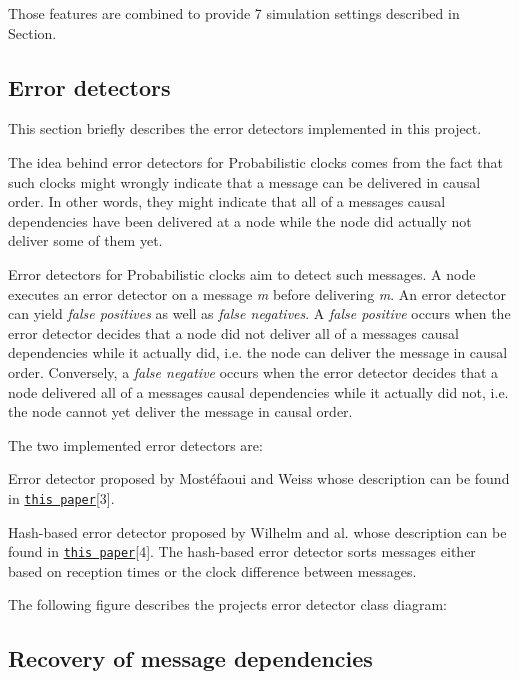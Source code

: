 Those features are combined to provide 7 simulation settings described in Section.

\subsection*{Error detectors}

This section briefly describes the error detectors implemented in this project.

The idea behind error detectors for Probabilistic clocks comes from the fact that such clocks might wrongly indicate that a message can be delivered in causal order. In other words, they might indicate that all of a message\textquotesingle{}s causal dependencies have been delivered at a node while the node did actually not deliver some of them yet.

Error detectors for Probabilistic clocks aim to detect such messages. A node executes an error detector on a message {\itshape m} before delivering {\itshape m}. An error detector can yield {\itshape false positives} as well as {\itshape false negatives}. A {\itshape false positive} occurs when the error detector decides that a node did not deliver all of a message\textquotesingle{}s causal dependencies while it actually did, i.\+e. the node can deliver the message in causal order. Conversely, a {\itshape false negative} occurs when the error detector decides that a node delivered all of a message\textquotesingle{}s causal dependencies while it actually did not, i.\+e. the node cannot yet deliver the message in causal order.

The two implemented error detectors are\+:
\begin{DoxyEnumerate}
\item Error detector proposed by Mostéfaoui and Weiss whose description can be found in \href{https://hal.science/hal-02056349/document}{\tt this paper}\mbox{[}3\mbox{]}.
\item Hash-\/based error detector proposed by Wilhelm and al. whose description can be found in \href{https://hal.science/hal-03984499}{\tt this paper}\mbox{[}4\mbox{]}. The hash-\/based error detector sorts messages either based on reception times or the clock difference between messages.
\end{DoxyEnumerate}

The following figure describes the project\textquotesingle{}s error detector class diagram\+: 

\subsection*{Recovery of message dependencies}


